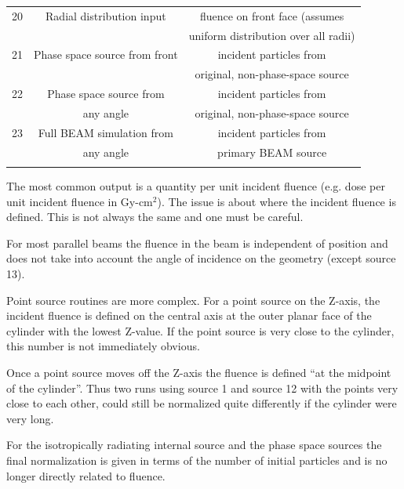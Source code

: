 \documentclass[12pt,twoside]{article}  %
\begin{document}
\begin{htmlonly}
\begin{table}[htb]
\begin{tabular}{|lcc|}
\hline
20 & Radial distribution input & fluence on front face (assumes\\
   &                           & uniform distribution over all radii)\\
\hline
21 & Phase space source from front & incident particles from\\
   &                               & original, non-phase-space source\\
\hline
22 & Phase space source from   & incident particles from\\
   & any angle  & original, non-phase-space source\\
\hline
23 & Full BEAM simulation from   & incident particles from\\
   & any angle  & primary BEAM source\\
\label{normtable}
\end{tabular}
\end{table}
\end{htmlonly}

The most common output is a quantity per unit incident fluence (e.g. dose
per  unit incident fluence in Gy-cm$^2$).  The issue is about where the
incident fluence is defined.  This is not always the same and one must be
careful.

For most parallel beams the fluence in the beam is independent of position
and does not take into account the angle of incidence on the geometry
(except source 13).

Point source routines are more complex.  For a point source on the Z-axis,
the incident fluence is defined on the central axis
at the outer planar face of the cylinder
with the lowest Z-value.  If the point source is very close to the
cylinder, this number is not immediately obvious.

Once a point source moves off the Z-axis the fluence is defined ``at the
midpoint of the cylinder''.  Thus two runs using source 1 and source 12
with the points very close to each other, could still be normalized quite
differently if the cylinder were very long.

For the isotropically radiating internal source and the phase space sources
the final
normalization is given in terms of the number of initial particles and is
no longer directly related to fluence.

\renewcommand{\leftmark}{{DOSRZnrc}}
\end{document}
